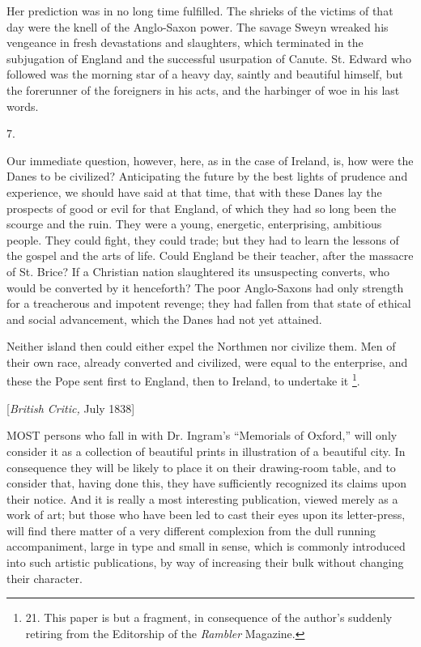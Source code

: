 Her prediction was in no long
time fulfilled. The shrieks of the victims of that day were the knell
of the Anglo-Saxon power. The savage Sweyn wreaked his vengeance in
fresh devastations and slaughters, which terminated in the subjugation
of England and the successful usurpation of Canute. St. Edward
who followed was the morning star of a heavy day, saintly and
beautiful himself, but the forerunner of the foreigners in his acts,
and the harbinger of woe in his last words.

7.

Our immediate question,
however, here, as in the case of Ireland, is, how were the Danes to be
civilized? Anticipating the future by the best lights of prudence and
experience, we should have said at that time, that with these Danes
lay the prospects of good or evil for that England, of which they had
so long been the scourge and the ruin. They were a young, energetic,
enterprising, ambitious people. They could fight, they could trade;
but they had to learn the lessons of the gospel and the arts of life.
Could England be their teacher, after the massacre of St. Brice? If a
Christian nation slaughtered its unsuspecting converts, who would be
converted by it henceforth? The poor Anglo-Saxons had only strength
for a treacherous and impotent revenge; they had fallen from that
state of ethical and social advancement, which the Danes had not yet
attained.

Neither island then could
either expel the Northmen nor civilize them. Men of their own race,
already converted and civilized, were equal to the enterprise, and
these the Pope sent first to England, then to Ireland, to undertake it
\footnote{21.
This paper is but a fragment, in consequence of the author's suddenly
retiring from the Editorship of the \emph{Rambler} Magazine.}.


[\emph{British Critic,} July
1838]

MOST
persons who fall in with Dr. Ingram's ``Memorials of Oxford,'' will only
consider it as a collection of beautiful prints in illustration of a
beautiful city. In consequence they will be likely to place it on
their drawing-room table, and to consider that, having done this, they
have sufficiently recognized its claims upon their notice. And it is
really a most interesting publication, viewed merely as a work of art;
but those who have been led to cast their eyes upon its letter-press,
will find there matter of a very different complexion from the dull
running accompaniment, large in type and small in sense, which is
commonly introduced into such artistic publications, by way of
increasing their bulk without changing their character.

